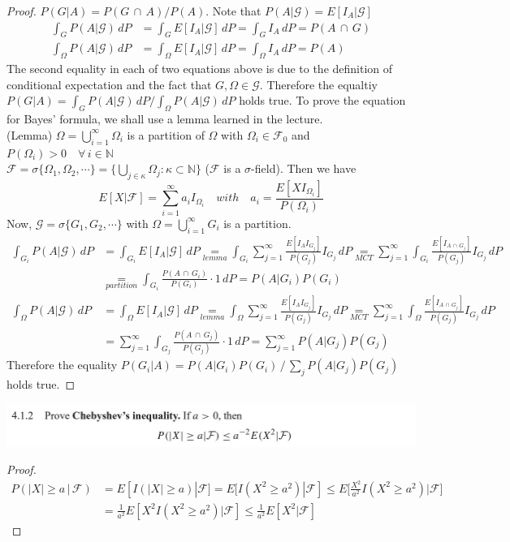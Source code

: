 \documentclass[12pt, A4]{article}
\newcommand{\N}{\mathbb{N}}
\newcommand{\G}{\mathcal{G}}
\newcommand{\F}{\mathcal{F}}
\newcommand{\intersect}{\,\cap\,}
\begin{document}
\begin{proof}
    $P(G|A)=P(G\intersect A)/P(A)$. Note that $P(A|\G)=E[I_A|\G]$
    \begin{align*}
        \int_G P(A|\G)\, dP &=\int_G E[I_A|\G]\,dP=\int_G I_A\, dP=P(A\intersect G) \\ \int_\Omega P(A|\G)\, dP &= \int_\Omega E[I_A|\G]\,dP=\int_\Omega I_A\, dP =P(A)
    \end{align*}
    The second equality in each of two equations above is due to the definition of conditional expectation and the fact that $G, \Omega \in \G$. Therefore the equaltiy $P(G|A)=\int_G P(A|\G)\, dP / \int_\Omega P(A|\G)\, dP$ holds true. To prove the equation for Bayes' formula, we shall use a lemma learned in the lecture.
	\\ (Lemma) $\Omega=\bigcup_{i=1}^\infty \Omega_i$ is a partition of $\Omega$ with $\Omega_i\in \F_0$ and $P(\Omega_i)>0\quad \forall \, i\in \N$ \\$\F=\sigma\{\Omega_1, \Omega_2,\cdots\}=\{\bigcup_{j\in \kappa} \Omega_j : \kappa\subset \N\}$ \quad ($\F$ is a $\sigma$-field). \quad Then we have 
	$$ E[X|\F]=\sum_{i=1}^\infty a_i I_{\Omega_i} \quad with \quad a_i=\frac{E[XI_{\Omega_i}]}{P(\Omega_i)}$$
	Now, $\G=\sigma\{G_1,G_2,\cdots\}$ with $\Omega=\bigcup_{i=1}^\infty G_i$ is a partition. 
	\begin{align*}
		\int_{G_i} P(A|\G)\,dP &= \int_{G_i} E[I_A|\G]\,dP \underset{lemma}{=} \int_{G_i} \sum_{j=1}^\infty \frac{E[I_A I_{G_j}]}{P(G_j)} I_{G_j}\,dP \underset{MCT}{=} \sum_{j=1}^\infty \int_{G_i}\frac{E[I_{A\intersect G_j}]}{P(G_j)} I_{G_j}\,dP \\ &\underset{partition}{=} \int_{G_i} \frac{P(A\intersect G_i)}{P(G_i)}\cdot 1\,dP = P(A|G_i) P(G_i) \\
		\int_{\Omega} P(A|\G)\,dP &= \int_{\Omega} E[I_A|\G]\,dP \underset{lemma}{=} \int_{\Omega} \sum_{j=1}^\infty \frac{E[I_A I_{G_j}]}{P(G_j)} I_{G_j}\,dP \underset{MCT}{=} \sum_{j=1}^\infty \int_{\Omega}\frac{E[I_{A\intersect G_j}]}{P(G_j)} I_{G_j}\,dP \\ &= \sum_{j=1}^\infty \int_{G_j} \frac{P(A\intersect G_j)}{P(G_j)}\cdot 1\,dP = \sum_{j=1}^\infty P(A|G_j) P(G_j) 
	\end{align*}
	Therefore the equality $P(G_i|A)=P(A|G_i)P(G_i) \,/\, \sum_j P(A|G_j)P(G_j)$ holds true.
\end{proof}
\clearpage

\includegraphics{Exer4.1.2.JPG}
\begin{proof}
	\begin{align*}
		P( |X|\geq a\, |\, \F)&=E[I(|X|\geq a)|\F] = E[I(X^2\geq a^2)|\F]\leq E\Big[\frac{X^2}{a^2}I(X^2\geq a^2)|\F\Big]\\ &= \frac{1}{a^2}E[X^2I(X^2\geq a^2)|\F]\leq \frac{1}{a^2}E[X^2|\F]
	\end{align*}
\end{proof}
\vspace{1cm}
\end{document}
